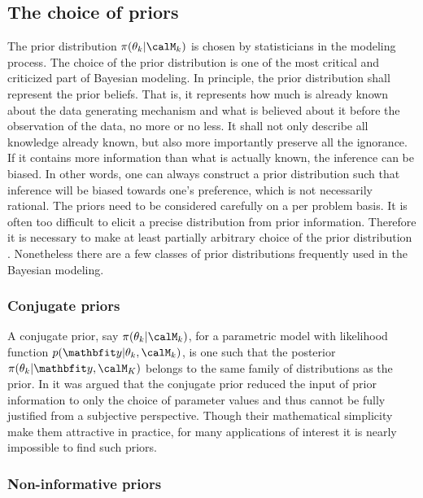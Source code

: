 \subsection{The choice of priors}
\label{sub:The choice of priors}

The prior distribution $\pi(\theta_k|\calM_k)$ is chosen by statisticians in
the modeling process. The choice of the prior distribution is one of the most
critical and criticized part of Bayesian modeling. In principle, the prior
distribution shall represent the prior beliefs. That is, it represents how
much is already known about the data generating mechanism and what is believed
about it before the observation of the data, no more or no less. It shall not
only describe all knowledge already known, but also more importantly preserve
all the ignorance. If it contains more information than what is actually
known, the inference can be biased. In other words, one can always construct a
prior distribution such that inference will be biased towards one's
preference, which is not necessarily rational. The priors need to be
considered carefully on a per problem basis. It is often too difficult to
elicit a precise distribution from prior information. Therefore it is
necessary to make at least partially arbitrary choice of the prior
distribution \cite[][chap.~3]{Robert:2007tc}\cite{Kass:1995vb}.  Nonetheless
there are a few classes of prior distributions frequently used in the Bayesian
modeling.

\subsubsection{Conjugate priors}
\label{ssub:Conjugate priors}

A conjugate prior, say $\pi(\theta_k|\calM_k)$, for a parametric model with
likelihood function $p(\data|\theta_k,\calM_k)$, is one such that the
posterior $\pi(\theta_k|\data,\calM_K)$ belongs to the same family of
distributions as the prior. In \cite[][sec.~5.2]{Bernardo:1994vd} it was
argued that the conjugate prior reduced the input of prior information to only
the choice of parameter values and thus cannot be fully justified from a
subjective perspective. Though their mathematical simplicity make them
attractive in practice, for many applications of interest it is nearly
impossible to find such priors.

\subsubsection{Non-informative priors}
\label{ssub:Non-informative priors}

